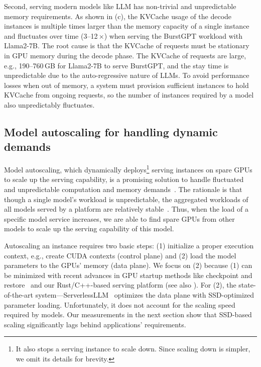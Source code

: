Second,
serving modern models like LLM
has non-trivial and unpredictable memory requirements.
As shown in
{} (c),
the KVCache usage of the decode instances is multiple times larger than the memory capacity
of a single instance and fluctuates over time (3--12\,$\times$) when serving the BurstGPT workload with Llama2-7B.
The root cause is that
the KVCache of requests must be stationary in GPU memory during the decode phase.
The KVCache of requests are large, e.g., 190--760\,GB for Llama2-7B to serve BurstGPT, 
and the stay time is unpredictable due to the auto-regressive nature of LLMs.
To avoid performance losses when out of memory,
a {\maas} system must provision sufficient instances
to hold KVCache from ongoing requests,
so the number of instances required by a model also unpredictably fluctuates.


\subsection{Model autoscaling for handling dynamic demands}

\noindent
Model autoscaling, which dynamically deploys\footnote{\footnotesize{It also stops a serving instance to scale down.
Since scaling down is simpler, we omit its details for brevity.}}
serving instances on spare GPUs to scale up the serving capability, is
a promising solution to handle fluctuated and unpredictable computation and memory demands~\cite{DBLP:journals/corr/abs-2401-14351,DBLP:conf/asplos/YangZLZLZCL22,serverless-ray}.
The rationale is that though a single model's workload is unpredictable,
the aggregated workloads of all models served by a platform are relatively stable~\cite{DBLP:conf/nsdi/0025TKS23}.
Thus, when the load of a specific model service increases,
we are able to find spare GPUs from other models to scale up the serving capability of this model. 

Autoscaling an instance requires two basic steps:
(1) initialize a proper execution context, e.g., create CUDA contexts (control plane)
and 
(2) load the model parameters to the GPUs' memory (data plane). 
We focus on (2) because (1) can be minimized with recent advances
in GPU startup methods like checkpoint
and restore~\cite{DBLP:journals/corr/abs-2405-12079,DBLP:conf/asplos/ZengXGCL25} 
and our Rust/C++-based serving platform
(see also \textsection{\ref{sec:eval-ablation}}).
For (2), the state-of-the-art system---ServerlessLLM~\cite{DBLP:journals/corr/abs-2401-14351}
optimizes the data plane with SSD-optimized parameter loading.
Unfortunately, it does not account for the scaling speed required by models.
Our measurements in the next section
show that SSD-based scaling significantly lags behind applications' requirements.


